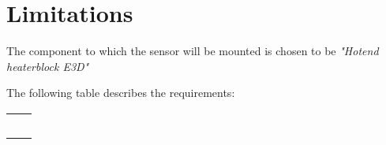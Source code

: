 \chapter*{Limitations}

The component to which the sensor will be mounted is chosen to
be \textit{"Hotend heaterblock E3D"}
\cite{1}

The following table describes the requirements:


\begin{center}
    \begin{tabular}{|c|c|}
        \hline
        &  \\
        \hline
        &  \\
        \hline
        &  \\
        \hline
        &  \\
        \hline
        &  \\
        \hline
        &  \\
        \hline
    \end{tabular}
\end{center}